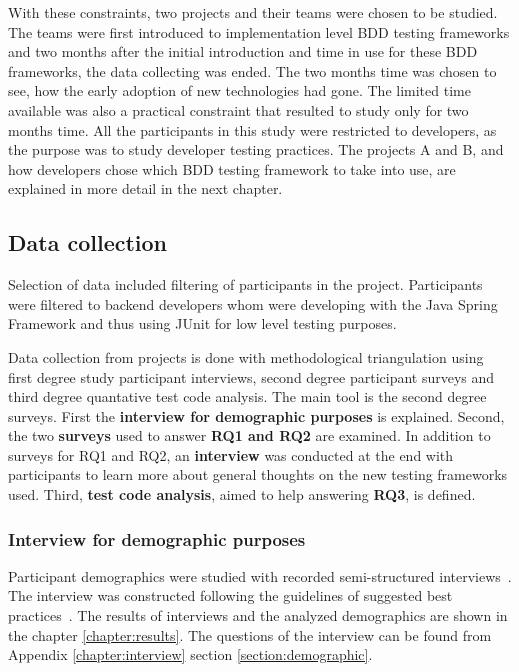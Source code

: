     With these constraints, two projects and their teams were chosen to be studied. The teams were first introduced to
    implementation level BDD testing frameworks and two months after the initial introduction and time in use for these BDD
    frameworks, the data collecting was ended. The two months time was chosen to see, how the early adoption of new technologies had gone.
    The limited time available was also a practical constraint that resulted to study only for two months time. All the participants
    in this study were restricted to developers, as the purpose was to study developer testing practices. The projects
    A and B, and how developers chose which BDD testing framework to take into use, are explained in more detail in the next chapter.


\subsection{Data collection}
    Selection of data included filtering of participants in the project. Participants were filtered to backend developers
    whom were developing with the Java Spring Framework and thus using JUnit for low level testing purposes.

    Data collection from projects is done with methodological triangulation using first degree study participant interviews, second degree
    participant surveys and third degree quantative test code analysis. The main tool is the second degree surveys.
    First the \textbf{interview for demographic purposes} is explained. Second, the two \textbf{surveys} used to answer
    \textbf{RQ1 and RQ2} are examined. In addition to surveys for RQ1 and RQ2, an \textbf{interview} was conducted at the end with participants to
    learn more about general thoughts on the new testing frameworks used.
    Third, \textbf{test code analysis}, aimed to help answering \textbf{RQ3}, is defined.

    \subsubsection{Interview for demographic purposes}
    Participant demographics were studied with recorded semi-structured interviews~\cite{cohen2006qualitative}.
    The interview was constructed following the guidelines of suggested best practices~\cite{kitchenham2002preliminary}.
    The results of interviews and the analyzed demographics are shown in the chapter
    \ref{chapter:results}. The questions of the interview can be found from Appendix \ref{chapter:interview} section
    \ref{section:demographic}.

